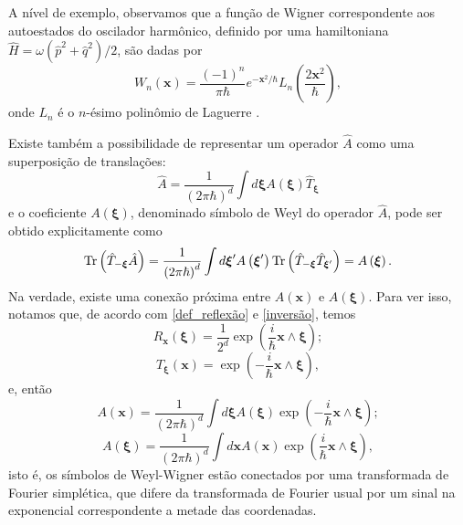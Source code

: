 \documentclass[
	12pt,
	oneside,			%
	a4paper,			%
	english,			%
	brazil				%
	]{abntex2}
\theoremstyle{definition}
\begin{document}
A nível de exemplo, observamos que a função de Wigner correspondente aos autoestados do oscilador harmônico, definido por uma hamiltoniana $\hat{H} = \omega \left( \hat{p}^2+\hat{q}^2 \right)/2$, são dadas por
\begin{equation}
\label{função de wigner do oscilador harmônico}
    W_n(\mathbf{x}) = \frac{(-1)^n}{\pi \hbar} e^{-\mathbf{x}^2/\hbar}L_n\left( \frac{2 \mathbf{x}^2}{\hbar} \right),
\end{equation}
onde $L_n$ é o $n$-ésimo polinômio de Laguerre \cite{GROENEWOLD1946405}. 

Existe também a possibilidade de representar um operador $\hat{A}$ como uma superposição de translações:
\begin{equation}
    \hat{A} = \frac{1}{\left(2 \pi \hbar\right)^d} \int d \boldsymbol{\xi} A(\boldsymbol{\xi}) \hat{T}_{\boldsymbol{\xi}}
\end{equation}
e o coeficiente $A(\boldsymbol{\xi})$, denominado símbolo de Weyl do operador $\hat{A}$, pode ser obtido explicitamente como
\begin{equation}
    \Tr \left(\hat{T}_{-\boldsymbol{\xi}}\hat{A}\right) = \frac{1}{\left(2 \pi \hbar\right)^d} \int d \boldsymbol{\xi}' A\left(\boldsymbol{\xi}'\right) \Tr \left(\hat{T}_{-\boldsymbol{\xi}}\hat{T}_{\boldsymbol{\xi}'}\right) = A\left(\boldsymbol{\xi}\right).
\end{equation}
Na verdade, existe uma conexão próxima entre $A(\mathbf{x})$ e $A\left(\boldsymbol{\xi}\right)$. Para ver isso, notamos que, de acordo com \eqref{def_reflexão} e \eqref{inversão}, temos
\begin{equation}
    R_{\mathbf{x}}\left(\boldsymbol{\xi}\right) = \frac{1}{2^d} \exp\left(\frac{i}{\hbar}\mathbf{x}\wedge\boldsymbol{\xi}\right);
\end{equation}
\begin{equation}
    T_{\boldsymbol{\xi}}\left(\mathbf{x}\right) =  \exp\left(-\frac{i}{\hbar}\mathbf{x}\wedge\boldsymbol{\xi}\right),
\end{equation}
e, então
\begin{equation}
    \label{wigner em termos de weyl}
    A \left(\mathbf{x}\right) = \frac{1}{\left(2 \pi \hbar\right)^d} \int d \boldsymbol{\xi} A(\boldsymbol{\xi}) \exp\left(-\frac{i}{\hbar}\mathbf{x}\wedge\boldsymbol{\xi}\right);
\end{equation}
\begin{equation}
    A\left(\boldsymbol{\xi}\right) = \frac{1}{\left(2\pi \hbar\right)^d} \int d\mathbf{x} A(\mathbf{x}) \exp\left(\frac{i}{\hbar}\mathbf{x}\wedge\boldsymbol{\xi}\right),
\end{equation}
isto é, os símbolos de Weyl-Wigner estão conectados por uma transformada de Fourier simplética, que difere da transformada de Fourier usual por um sinal na exponencial correspondente a metade das coordenadas.
\end{document}
